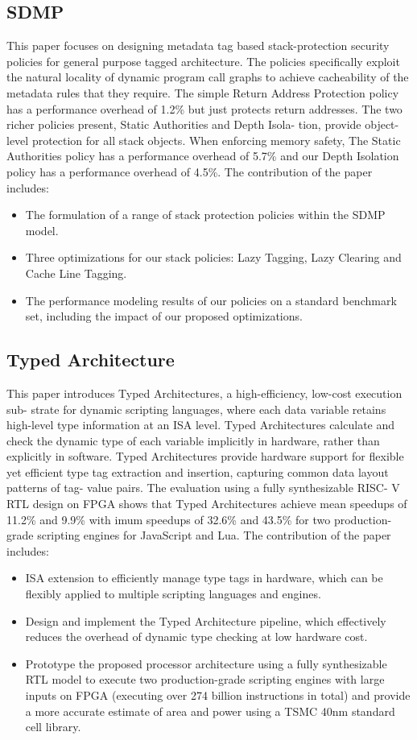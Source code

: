 \subsection{SDMP}
This paper focuses on designing metadata tag based stack-protection security policies for general purpose tagged
architecture. The policies specifically
exploit the natural locality of dynamic program call graphs to
achieve cacheability of the metadata rules that they require.
The simple Return Address Protection policy has a performance
overhead of 1.2\% but just protects return addresses.
The two richer policies present, Static Authorities and Depth Isola-
tion, provide object-level protection for all stack objects. When
enforcing memory safety, The Static Authorities policy has a
performance overhead of 5.7\% and our Depth Isolation policy
has a performance overhead of 4.5\%.
The contribution of the paper includes:
\begin{itemize}
  \item The formulation of a range of stack protection policies
within the SDMP model.
  \item Three optimizations for our stack policies: Lazy Tagging,
Lazy Clearing and Cache Line Tagging.
  \item The performance modeling results of our policies on
a standard benchmark set, including the impact of our
proposed optimizations.
\end{itemize}  

\subsection{Typed Architecture}
This paper introduces Typed
Architectures, a high-efficiency, low-cost execution sub-
strate for dynamic scripting languages, where each data
variable retains high-level type information at an ISA level.
Typed Architectures calculate and check the dynamic type
of each variable implicitly in hardware, rather than explicitly
in software. Typed Architectures provide
hardware support for flexible yet efficient type tag extraction
and insertion, capturing common data layout patterns of tag-
value pairs. The evaluation using a fully synthesizable RISC-
V RTL design on FPGA shows that Typed Architectures
achieve mean speedups of 11.2\% and 9.9\% with
imum speedups of 32.6\% and 43.5\% for two production-
grade scripting engines for JavaScript and Lua. 
The contribution of the paper includes:
\begin{itemize}
  \item ISA extension to efficiently manage
type tags in hardware, which can be flexibly applied to
multiple scripting languages and engines.
  \item Design and implement the Typed Architecture pipeline,
which effectively reduces the overhead of dynamic type
checking at low hardware cost.
  \item Prototype the proposed processor architecture using 
a fully synthesizable RTL model to execute two
production-grade scripting engines with large inputs on
FPGA (executing over 274 billion instructions in total)
and provide a more accurate estimate of area and power
using a TSMC 40nm standard cell library.
\end{itemize}

